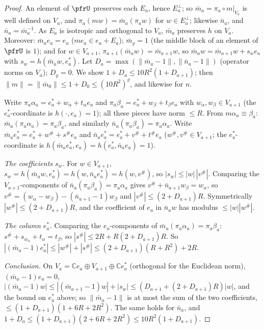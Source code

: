 \documentclass[10pt]{amsart}
\theoremstyle{definition}
\theoremstyle{remark}
\newcommand{\C}{\mathbb C}
\begin{document}
\begin{proof}
An element of $\pfrU$ preserves each $E_a$, hence $E_a^\perp$; so $\bar m_a=\pi_a\circ m|_{V_a}$ is well defined on
$V_a$, and $\pi_a(mw)=\bar m_a(\pi_aw)$ for $w\in E_a^\perp$; likewise $\bar n_a$, and $\bar n_a=\bar m_a^{-1}$. As $E_a$
is isotropic and orthogonal to $V_a$, $\bar m_a$ preserves $h$ on $V_a$. Moreover: $\bar m_a e_a=e_a$
($me_a\in e_a+E_a$); $\bar m_\varrho=1$ (the middle block of an element of $\pfrU$ is $1$); and for $w\in V_{a+1}$,
$\pi_{a+1}(\bar m_aw)=\bar m_{a+1}w$, so $\bar m_aw=\bar m_{a+1}w+s_w e_a$ with $s_w=h(\bar m_aw,e_a^*)$. Let
$D_a=\max(\|\bar m_a-1\|,\|\bar n_a-1\|)$ (operator norms on $V_a$); $D_\varrho=0$. We show
$1+D_a\le10R^2(1+D_{a+1})$; then $\|m\|=\|\bar m_0\|\le1+D_0\le(10R^2)^\varrho$, and likewise for $n$.

Write $\pi_a\alpha_a=e_a^*+w_\alpha+t_\alpha e_a$ and $\pi_a\beta_a=e_a^*+w_\beta+t_\beta e_a$ with
$w_\alpha,w_\beta\in V_{a+1}$ (the $e_a^*$-coordinate is $h(\cdot,e_a)=1$); all these pieces have norm $\le R$. From
$m\alpha_a\equiv\beta_a$: $\bar m_a(\pi_a\alpha_a)=\pi_a\beta_a$, and similarly $\bar n_a(\pi_a\beta_a)=\pi_a\alpha_a$.
Write $\bar m_ae_a^*=e_a^*+w^\#+s^\#e_a$ and $\bar n_ae_a^*=e_a^*+v^\#+t^\#e_a$ ($w^\#,v^\#\in V_{a+1}$; the
$e_a^*$-coordinate is $h(\bar m_ae_a^*,e_a)=h(e_a^*,\bar n_ae_a)=1$).

\emph{The coefficients $s_w$.} For $w\in V_{a+1}$, $s_w=h(\bar m_aw,e_a^*)=h(w,\bar n_ae_a^*)=h(w,v^\#)$, so
$|s_w|\le|w|\,|v^\#|$. Comparing the $V_{a+1}$-components of $\bar n_a(\pi_a\beta_a)=\pi_a\alpha_a$ gives
$v^\#+\bar n_{a+1}w_\beta=w_\alpha$, so $v^\#=(w_\alpha-w_\beta)-(\bar n_{a+1}-1)w_\beta$ and
$|v^\#|\le(2+D_{a+1})R$. Symmetrically $|w^\#|\le(2+D_{a+1})R$, and the coefficient of $e_a$ in $\bar n_aw$ has
modulus $\le|w||w^\#|$.

\emph{The column $e_a^*$.} Comparing the $e_a$-components of $\bar m_a(\pi_a\alpha_a)=\pi_a\beta_a$:
$s^\#+s_{w_\alpha}+t_\alpha=t_\beta$, so $|s^\#|\le2R+R(2+D_{a+1})R$. So
$|(\bar m_a-1)e_a^*|\le|w^\#|+|s^\#|\le(2+D_{a+1})(R+R^2)+2R$.

\emph{Conclusion.} On $V_a=\C e_a\oplus V_{a+1}\oplus\C e_a^*$ (orthogonal for the Euclidean norm),
$(\bar m_a-1)e_a=0$, $|(\bar m_a-1)w|\le|(\bar m_{a+1}-1)w|+|s_w|\le(D_{a+1}+(2+D_{a+1})R)|w|$, and the bound on
$e_a^*$ above; so $\|\bar m_a-1\|$ is at most the sum of the two coefficients, $\le(1+D_{a+1})(1+6R+2R^2)$. The
same holds for $\bar n_a$, and $1+D_a\le(1+D_{a+1})(2+6R+2R^2)\le10R^2(1+D_{a+1})$.
\end{proof}
\end{document}
